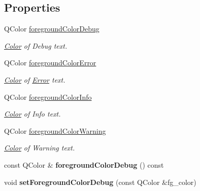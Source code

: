 \subsection*{Properties}
\begin{DoxyCompactItemize}
\item 
Q\+Color \mbox{\hyperlink{classrev_1_1_view_1_1_console_tool_a29f7e03610399e9597e9af055408e40b}{foreground\+Color\+Debug}}
\begin{DoxyCompactList}\small\item\em \mbox{\hyperlink{classrev_1_1_color}{Color}} of Debug text. \end{DoxyCompactList}\item 
Q\+Color \mbox{\hyperlink{classrev_1_1_view_1_1_console_tool_a920e3766992555ec588137994e85bec1}{foreground\+Color\+Error}}
\begin{DoxyCompactList}\small\item\em \mbox{\hyperlink{classrev_1_1_color}{Color}} of \mbox{\hyperlink{class_error}{Error}} text. \end{DoxyCompactList}\item 
Q\+Color \mbox{\hyperlink{classrev_1_1_view_1_1_console_tool_a14d2d54d834150d69f4e3519fe975b0b}{foreground\+Color\+Info}}
\begin{DoxyCompactList}\small\item\em \mbox{\hyperlink{classrev_1_1_color}{Color}} of Info text. \end{DoxyCompactList}\item 
Q\+Color \mbox{\hyperlink{classrev_1_1_view_1_1_console_tool_a261edea33d81e305e6b62ea5d4f10abd}{foreground\+Color\+Warning}}
\begin{DoxyCompactList}\small\item\em \mbox{\hyperlink{classrev_1_1_color}{Color}} of Warning text. \end{DoxyCompactList}\item 
\mbox{\label{classrev_1_1_view_1_1_console_tool_a723eb5715849591301cfe3cebb2c094c}} 
const Q\+Color \& {\bfseries foreground\+Color\+Debug} () const
\item 
\mbox{\label{classrev_1_1_view_1_1_console_tool_a41a5c1fdf4b6eaafc10d96d2933ab73b}} 
void {\bfseries set\+Foreground\+Color\+Debug} (const Q\+Color \&fg\+\_\+color)
\item 
\mbox{\label{classrev_1_1_view_1_1_console_tool_ac716afae2cdd77c9e838f96d226f2ea9}} 

\end{DoxyCompactItemize}
